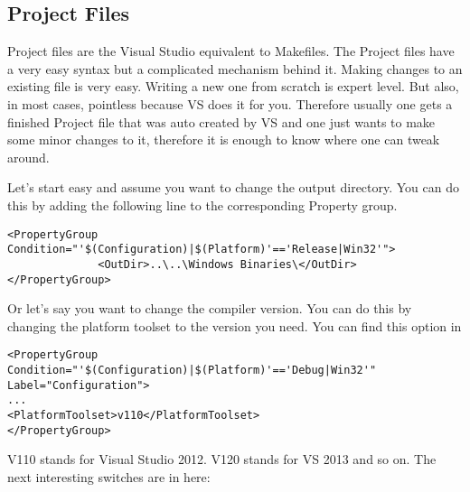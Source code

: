 \subsection{Project Files}
Project files are the Visual Studio equivalent to Makefiles. The Project files have a very easy syntax but a complicated mechanism behind it. Making changes to an existing file is very easy. Writing a new one from scratch is expert level. But also, in most cases, pointless because VS does it for you. Therefore usually one gets a finished Project file that was auto created by VS and one just wants to make some minor changes to it, therefore it is enough to know where one can tweak around. 

Let's start easy and assume you want to change the output directory. You can do this by adding the following line to the corresponding Property group. 

\lstset{language=XML}
\begin{lstlisting}
<PropertyGroup Condition="'$(Configuration)|$(Platform)'=='Release|Win32'">   
              <OutDir>..\..\Windows Binaries\</OutDir>
</PropertyGroup>

\end{lstlisting}

Or let's say you want to change the compiler version. You can do this by changing the platform toolset to the version you need. You can find this option in 
\lstset{language=XML}
\begin{lstlisting}
<PropertyGroup Condition="'$(Configuration)|$(Platform)'=='Debug|Win32'" Label="Configuration">
...
<PlatformToolset>v110</PlatformToolset>
</PropertyGroup>
\end{lstlisting}

V110 stands for Visual Studio 2012. V120 stands for VS 2013 and so on.
The next interesting switches are in here:

